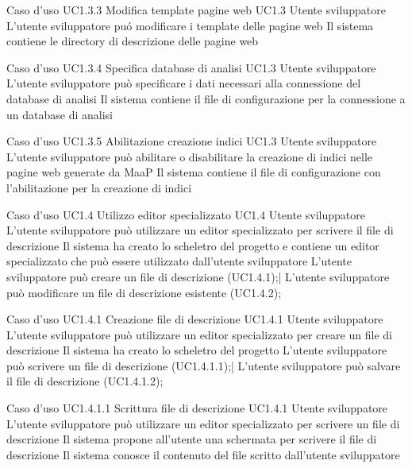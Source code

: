 \UCtitle
{Caso d'uso UC1.3.3}
{Modifica template pagine web}
\UC
{UC1.3}
{Utente sviluppatore}
{L'utente sviluppatore pu\'o modificare i template delle pagine web}
{Il sistema contiene le directory di descrizione delle pagine web}

\UCtitle
{Caso d'uso UC1.3.4}
{Specifica database di analisi}
\UC
{UC1.3}
{Utente sviluppatore}
{L'utente sviluppatore può specificare i dati necessari alla connessione del database di analisi}
{Il sistema contiene il file di configurazione per la connessione a un database di analisi}

\UCtitle
{Caso d'uso UC1.3.5}
{Abilitazione creazione indici}
\UC
{UC1.3}
{Utente sviluppatore}
{L'utente sviluppatore può abilitare o disabilitare la creazione di indici nelle pagine web generate da MaaP}
{Il sistema contiene il file di configurazione con l'abilitazione per la creazione di indici}

\UCtitle
{Caso d'uso UC1.4}
{Utilizzo editor specializzato}
\UC
{UC1.4}
{Utente sviluppatore}
{L'utente sviluppatore può utilizzare un editor specializzato per scrivere il file di descrizione}
{Il sistema ha creato lo scheletro del progetto e contiene un editor specializzato che può essere utilizzato dall'utente sviluppatore}
\scenario
{L'utente sviluppatore può creare un file di descrizione (UC1.4.1);|
L'utente sviluppatore può modificare un file di descrizione esistente (UC1.4.2);
}

\UCtitle
{Caso d'uso UC1.4.1}
{Creazione file di descrizione}
\UC
{UC1.4.1}
{Utente sviluppatore}
{L'utente sviluppatore può utilizzare un editor specializzato per creare un file di descrizione}
{Il sistema ha creato lo scheletro del progetto}
\scenario
{L'utente sviluppatore può scrivere un file di descrizione (UC1.4.1.1);|
L'utente sviluppatore può salvare il file di descrizione (UC1.4.1.2);
}

\UCtitle
{Caso d'uso UC1.4.1.1}
{Scrittura file di descrizione}
\UC
{UC1.4.1}
{Utente sviluppatore}
{L'utente sviluppatore può utilizzare un editor specializzato per scrivere un file di descrizione}
{Il sistema propone all'utente una schermata per scrivere il file di descrizione}
\post
{Il sistema conosce il contenuto del file scritto dall'utente sviluppatore}

